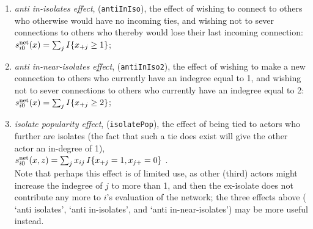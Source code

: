 \documentclass[a4paper,fleqn,11pt]{article}
\newcommand{\+}{\, + \,}
\newcommand{\vit}{\theenumi}
\newcommand{\rs}{{\sf RSiena}}
\newcounter{savenumi}
\begin{document}
\begin{enumerate}

\item \emph{anti in-isolates effect}, (\texttt{antiInIso}), the effect of
      wishing to connect to others who otherwise would have
      no incoming ties, and wishing not to sever connections to
      others who thereby would lose their last incoming connection: \\
$s^{\rm net}_{i\vit}(x) = \sum_j I\{x_{+j} \geq 1 \} $;
\item \emph{anti in-near-isolates effect}, (\texttt{antiInIso2}),
      the effect of
      wishing to make a new connection to others who currently have
      an indegree equal to 1, and wishing not to sever connections to
      others who currently have an indegree equal to 2:\\
$s^{\rm net}_{i\vit}(x) = \sum_j I\{x_{+j} \geq 2 \} $;

\item \emph{isolate popularity effect}, (\texttt{isolatePop}), the effect of
      being tied to actors who further are isolates
      (the fact that such a tie does exist will give the other actor
      an in-degree of 1),\\
$s^{\rm net}_{i\vit}(x, z) = \sum_j x_{ij}\, I\{x_{+j} = 1, x_{j+} = 0 \} $ .\\
     Note that perhaps this effect is of limited use, as other (third) actors
     might increase the indegree of $j$ to more than 1, and then the ex-isolate
     does not contribute any more to $i$'s evaluation of the network;
     the three effects above ( `anti isolates', `anti in-isolates',
     and `anti in-near-isolates') may be more useful instead.
\setcounter{savenumi}{\value{enumi}}
\end{enumerate}
\end{document}
